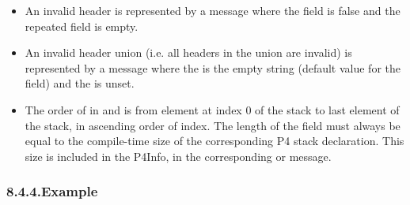 \documentclass[11pt]{article}
\begin{document}
{\begin{itemize}
\item{}
An invalid header is represented by a  message where the 
field is false and the  repeated field is empty.%

\item{}
An invalid header union (i.e. all headers in the union are invalid) is
represented by a  message where the  is the
empty string (default value for the field) and the  is unset.%

\item{}
The order of  in  and  is from
element at index 0 of the stack to last element of the stack, in ascending
order of index. The length of the  field must always be equal to the
compile-time size of the corresponding P4 stack declaration. This size is
included in the P4Info, in the corresponding  or
 message.%
\end{itemize}%

\subsubsection{8.4.4.\hspace*{0.5em}Example}\label{sec-example}%

}
\end{document}
